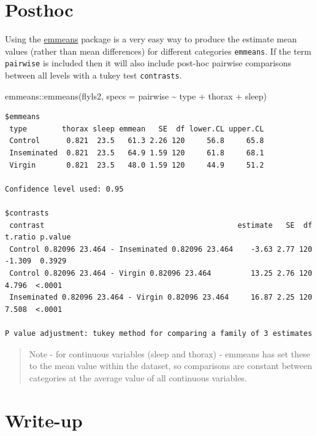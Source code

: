 \documentclass[
]{book}
\newenvironment{Shaded}{\begin{snugshade}}{\end{snugshade}}
\newcommand{\AttributeTok}[1]{\textcolor[rgb]{0.77,0.63,0.00}{#1}}
\newcommand{\FunctionTok}[1]{\textcolor[rgb]{0.00,0.00,0.00}{#1}}
\newcommand{\NormalTok}[1]{#1}
\newcommand{\SpecialCharTok}[1]{\textcolor[rgb]{0.00,0.00,0.00}{#1}}
\begin{document}
\hypertarget{posthoc}{%
\section{Posthoc}\label{posthoc}}

Using the \href{https://aosmith.rbind.io/2019/03/25/getting-started-with-emmeans/}{emmeans} package is a very easy way to produce the estimate mean values (rather than mean differences) for different categories \texttt{emmeans}. If the term \texttt{pairwise} is included then it will also include post-hoc pairwise comparisons between all levels with a tukey test \texttt{contrasts}.

\begin{Shaded}
\begin{Highlighting}[]
\NormalTok{emmeans}\SpecialCharTok{::}\FunctionTok{emmeans}\NormalTok{(flyls2, }\AttributeTok{specs =}\NormalTok{ pairwise }\SpecialCharTok{\textasciitilde{}}\NormalTok{ type }\SpecialCharTok{+}\NormalTok{ thorax }\SpecialCharTok{+}\NormalTok{ sleep)}
\end{Highlighting}
\end{Shaded}

\begin{verbatim}
$emmeans
 type        thorax sleep emmean   SE  df lower.CL upper.CL
 Control      0.821  23.5   61.3 2.26 120     56.8     65.8
 Inseminated  0.821  23.5   64.9 1.59 120     61.8     68.1
 Virgin       0.821  23.5   48.0 1.59 120     44.9     51.2

Confidence level used: 0.95 

$contrasts
 contrast                                            estimate   SE  df t.ratio p.value
 Control 0.82096 23.464 - Inseminated 0.82096 23.464    -3.63 2.77 120 -1.309  0.3929 
 Control 0.82096 23.464 - Virgin 0.82096 23.464         13.25 2.76 120  4.796  <.0001 
 Inseminated 0.82096 23.464 - Virgin 0.82096 23.464     16.87 2.25 120  7.508  <.0001 

P value adjustment: tukey method for comparing a family of 3 estimates 
\end{verbatim}

\begin{quote}
Note - for continuous variables (sleep and thorax) - emmeans has set these to the mean value within the dataset, so comparisons are constant between categories at the average value of all continuous variables.
\end{quote}

\hypertarget{write-up}{%
\section{Write-up}\label{write-up}}
\end{document}
